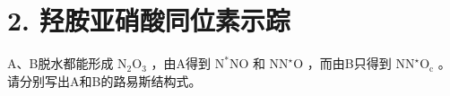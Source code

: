 \section*{2. 羟胺亚硝酸同位素示踪}
A、B脱⽔都能形成 $\mathrm { N } _ { 2 } \mathrm { O } _ { 3 }$ ，由A得到 $\mathrm { N } ^ { \ast } \mathrm { N O }$ 和 $\mathrm { N N ^ { \star } O }$ ，⽽由B只得到 $\mathrm { N N ^ { \star } O _ { c } }$ 。请分别写出A和B的路易斯结构式。
